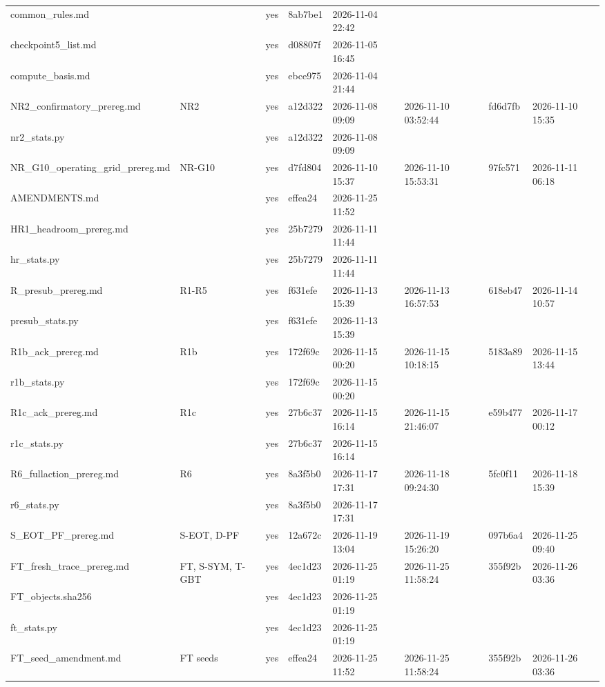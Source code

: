 \documentclass[10pt]{article}
\begin{document}
\begin{landscape}
\begin{longtable}{@{}llllllll@{}}
common\_rules.md &  & yes & 8ab7be1 & 2026-11-04 22:42 &  &  &  \\
checkpoint5\_list.md &  & yes & d08807f & 2026-11-05 16:45 &  &  &  \\
compute\_basis.md &  & yes & ebce975 & 2026-11-04 21:44 &  &  &  \\
NR2\_confirmatory\_prereg.md & NR2 & yes & a12d322 & 2026-11-08 09:09 & 2026-11-10 03:52:44 & fd6d7fb & 2026-11-10 15:35 \\
nr2\_stats.py &  & yes & a12d322 & 2026-11-08 09:09 &  &  &  \\
NR\_G10\_operating\_grid\_prereg.md & NR-G10 & yes & d7fd804 & 2026-11-10 15:37 & 2026-11-10 15:53:31 & 97fc571 & 2026-11-11 06:18 \\
AMENDMENTS.md &  & yes & effea24 & 2026-11-25 11:52 &  &  &  \\
HR1\_headroom\_prereg.md &  & yes & 25b7279 & 2026-11-11 11:44 &  &  &  \\
hr\_stats.py &  & yes & 25b7279 & 2026-11-11 11:44 &  &  &  \\
R\_presub\_prereg.md & R1-R5 & yes & f631efe & 2026-11-13 15:39 & 2026-11-13 16:57:53 & 618eb47 & 2026-11-14 10:57 \\
presub\_stats.py &  & yes & f631efe & 2026-11-13 15:39 &  &  &  \\
R1b\_ack\_prereg.md & R1b & yes & 172f69c & 2026-11-15 00:20 & 2026-11-15 10:18:15 & 5183a89 & 2026-11-15 13:44 \\
r1b\_stats.py &  & yes & 172f69c & 2026-11-15 00:20 &  &  &  \\
R1c\_ack\_prereg.md & R1c & yes & 27b6c37 & 2026-11-15 16:14 & 2026-11-15 21:46:07 & e59b477 & 2026-11-17 00:12 \\
r1c\_stats.py &  & yes & 27b6c37 & 2026-11-15 16:14 &  &  &  \\
R6\_fullaction\_prereg.md & R6 & yes & 8a3f5b0 & 2026-11-17 17:31 & 2026-11-18 09:24:30 & 5fc0f11 & 2026-11-18 15:39 \\
r6\_stats.py &  & yes & 8a3f5b0 & 2026-11-17 17:31 &  &  &  \\
S\_EOT\_PF\_prereg.md & S-EOT, D-PF & yes & 12a672c & 2026-11-19 13:04 & 2026-11-19 15:26:20 & 097b6a4 & 2026-11-25 09:40 \\
FT\_fresh\_trace\_prereg.md & FT, S-SYM, T-GBT & yes & 4ec1d23 & 2026-11-25 01:19 & 2026-11-25 11:58:24 & 355f92b & 2026-11-26 03:36 \\
FT\_objects.sha256 &  & yes & 4ec1d23 & 2026-11-25 01:19 &  &  &  \\
ft\_stats.py &  & yes & 4ec1d23 & 2026-11-25 01:19 &  &  &  \\
FT\_seed\_amendment.md & FT seeds & yes & effea24 & 2026-11-25 11:52 & 2026-11-25 11:58:24 & 355f92b & 2026-11-26 03:36 \\
\bottomrule
\end{longtable}
\normalsize

\end{landscape}
\end{document}
